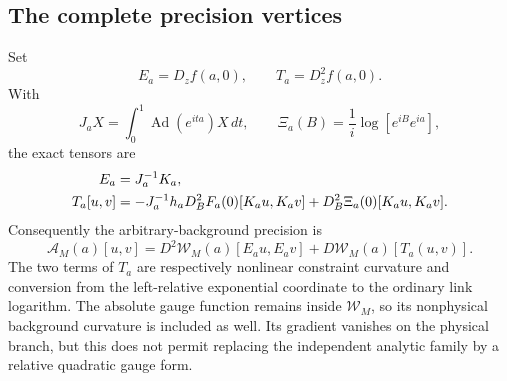 \subsection{The complete precision vertices}
\label{dmt-precision-vertices-section}

Set
\begin{equation}
 E_a=D_zf(a,0),\qquad T_a=D_z^2f(a,0).
 \label{dmt-chart-tensors}
\end{equation}
With
\[
 J_aX=\int_0^1\operatorname{Ad}(e^{ita})X\,dt,\qquad
 \Xi_a(B)=\frac1i\log[e^{iB}e^{ia}],
\]
the exact tensors are
\begin{align}
 E_a&=J_a^{-1}K_a,\notag\\
 T_a[u,v]&=-J_a^{-1}h_aD_B^2F_a(0)[K_au,K_av]
       +D_B^2\Xi_a(0)[K_au,K_av].
 \label{dmt-both-chart-curvatures}
\end{align}
Consequently the arbitrary-background precision is
\begin{equation}
 \mathscr A_M(a)[u,v]
       =D^2\mathcal W_M(a)[E_au,E_av]
                  +D\mathcal W_M(a)[T_a(u,v)].
 \label{dmt-complete-precision}
\end{equation}
The two terms of \(T_a\) are respectively nonlinear constraint
curvature and conversion from the left-relative exponential
coordinate to the ordinary link logarithm. The absolute gauge
function remains inside \(\mathcal W_M\), so its nonphysical
background curvature is included as well. Its gradient
vanishes on the physical branch, but this does not permit
replacing the independent analytic family by a relative
quadratic gauge form.

